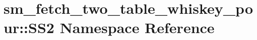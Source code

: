 \hypertarget{namespacesm__fetch__two__table__whiskey__pour_1_1SS2}{}\section{sm\+\_\+fetch\+\_\+two\+\_\+table\+\_\+whiskey\+\_\+pour\+:\+:S\+S2 Namespace Reference}
\label{namespacesm__fetch__two__table__whiskey__pour_1_1SS2}
